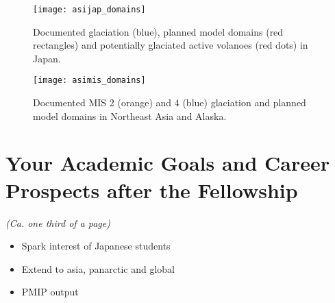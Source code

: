 \documentclass{article}
\begin{document}
    \begin{figure}
      \centerline{\texttt{[image: asijap\_domains]}}
      \caption{%
        Documented glaciation (blue), planned model domains (red rectangles)
        and potentially glaciated active volanoes (red dots) in Japan.}
      \label{fig:japan}
    \end{figure}

    \begin{figure}
      \centerline{\texttt{[image: asimis\_domains]}}
      \caption{%
        Documented MIS 2 (orange) and 4 (blue) glaciation and planned model
        domains in Northeast Asia and Alaska.}
      \label{fig:asia}
    \end{figure}


\section{Your Academic Goals and Career Prospects after the Fellowship}

    \emph{(Ca. one third of a page)}

    \begin{itemize}
      \item{Spark interest of Japanese students}
      \item{Extend to asia, panarctic and global}
      \item{PMIP output}
    \end{itemize}

\end{document}
